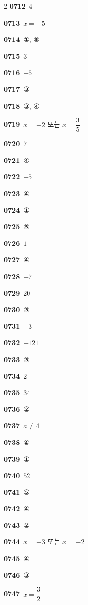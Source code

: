 \documentclass[10pt,a4paper]{article}
\begin{document}
\begin{multicols}{2}
\noindent\textbf{0712}\ $4$\par
\noindent\textbf{0713}\ $x=-5$\par
\noindent\textbf{0714}\ ①, ⑤\par
\noindent\textbf{0715}\ $3$\par
\noindent\textbf{0716}\ $-6$\par
\noindent\textbf{0717}\ ③\par
\noindent\textbf{0718}\ ③, ④\par
\noindent\textbf{0719}\ $x=-2$ 또는 $x=\dfrac{3}{5}$\par
\noindent\textbf{0720}\ $7$\par
\noindent\textbf{0721}\ ④\par
\noindent\textbf{0722}\ $-5$\par
\noindent\textbf{0723}\ ④\par
\noindent\textbf{0724}\ ①\par
\noindent\textbf{0725}\ ⑤\par
\noindent\textbf{0726}\ $1$\par
\noindent\textbf{0727}\ ④\par
\noindent\textbf{0728}\ $-7$\par
\noindent\textbf{0729}\ $20$\par
\noindent\textbf{0730}\ ③\par
\noindent\textbf{0731}\ $-3$\par
\noindent\textbf{0732}\ $-121$\par
\noindent\textbf{0733}\ ③\par
\noindent\textbf{0734}\ $2$\par
\noindent\textbf{0735}\ $34$\par
\noindent\textbf{0736}\ ②\par
\noindent\textbf{0737}\ $a\neq 4$\par
\noindent\textbf{0738}\ ④\par
\noindent\textbf{0739}\ ①\par
\noindent\textbf{0740}\ $52$\par
\noindent\textbf{0741}\ ⑤\par
\noindent\textbf{0742}\ ④\par
\noindent\textbf{0743}\ ②\par
\noindent\textbf{0744}\ $x=-3$ 또는 $x=-2$\par
\noindent\textbf{0745}\ ④\par
\noindent\textbf{0746}\ ③\par
\noindent\textbf{0747}\ $x=\dfrac{3}{2}$\par

\end{multicols}
\end{document}
